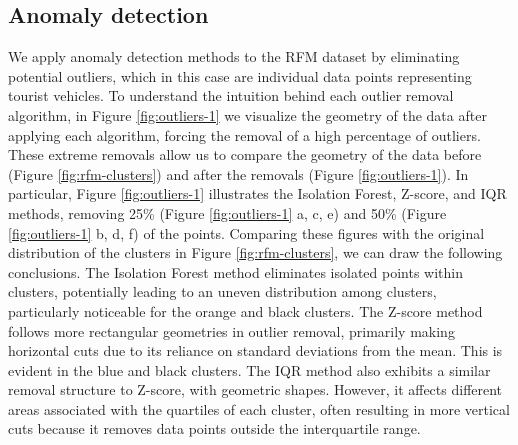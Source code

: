 \documentclass{ws-ijitdm}
\begin{document}
\subsection{Anomaly detection}

We apply anomaly detection methods to the RFM dataset by eliminating potential outliers, which in this case are individual data points representing tourist vehicles. To understand the intuition behind each outlier removal algorithm, in Figure \ref{fig:outliers-1} we visualize the geometry of the data after applying each algorithm, forcing the removal of a high percentage of outliers. These extreme removals allow us to compare the geometry of the data before (Figure \ref{fig:rfm-clusters}) and after the removals (Figure \ref{fig:outliers-1}). In particular, Figure \ref{fig:outliers-1} illustrates the Isolation Forest, Z-score, and IQR methods, removing 25\% (Figure \ref{fig:outliers-1} a, c, e) and 50\% (Figure \ref{fig:outliers-1} b, d, f) of the points. Comparing these figures with the original distribution of the clusters in Figure \ref{fig:rfm-clusters}, we can draw the following conclusions. The Isolation Forest method eliminates isolated points within clusters, potentially leading to an uneven distribution among clusters, particularly noticeable for the orange and black clusters. The Z-score method follows more rectangular geometries in outlier removal, primarily making horizontal cuts due to its reliance on standard deviations from the mean. This is evident in the blue and black clusters. The IQR method also exhibits a similar removal structure to Z-score, with geometric shapes. However, it affects different areas associated with the quartiles of each cluster, often resulting in more vertical cuts because it removes data points outside the interquartile range.
\end{document}
